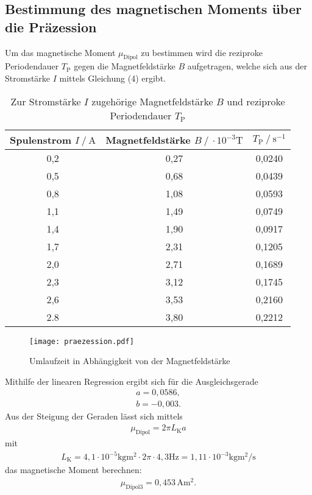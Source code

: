 \subsection{Bestimmung des magnetischen Moments über die Präzession}
Um das magnetische Moment $\mu_\text{Dipol}$ zu bestimmen wird die reziproke Periodendauer $T_\text{P}$
gegen die Magnetfeldstärke $B$ aufgetragen, welche sich aus der Stromstärke $I$ mittels Gleichung (4) ergibt.
\begin{table}
\centering
\caption{Zur Stromstärke $I$ zugehörige Magnetfeldstärke $B$ und reziproke Periodendauer $T_\text{P}$}
\label{tab:praezession}
\begin{tabular}{c c c}
\toprule
Spulenstrom $I\:/\:\si{\ampere}$ & Magnetfeldstärke $B\:/\:\cdot 10^{-3}\si{\tesla}$ & $T_\text{P}\:/\:\si{\second}^{-1}$ \\
\midrule
0,2 & 0,27 & 0,0240 \\
0,5 & 0,68 & 0,0439 \\
0,8 & 1,08 & 0,0593 \\
1,1 & 1,49 & 0,0749 \\
1,4 & 1,90 & 0,0917 \\
1,7 & 2,31 & 0,1205 \\
2,0 & 2,71 & 0,1689 \\
2,3 & 3,12 & 0,1745 \\
2,6 & 3,53 & 0,2160 \\
2.8 & 3,80 & 0,2212 \\
\bottomrule
\end{tabular}
\end{table}
\begin{figure}
  \center
  \texttt{[image: praezession.pdf]}
  \caption{Umlaufzeit in Abhängigkeit von der Magnetfeldstärke}
  \label{fig:praezession}
\end{figure}

Mithilfe der linearen Regression ergibt sich für die Ausgleichsgerade
\begin{gather*}
a = 0,0586, \\
b = -0,003.
\end{gather*}
Aus der Steigung der Geraden lässt sich mittels
\begin{gather}
\mu_\text{Dipol} = 2\pi L_\text{K} a
\end{gather}
mit
\begin{gather*}
L_\text{K} = 4,1 \cdot 10^{-5} \si{\kilo\gram\meter\squared} \cdot 2\pi \cdot 4,3\si{\hertz} = 1,11 \cdot 10^{-3} \si{\kilo\gram\meter\squared\per\second}
\end{gather*}
das magnetische Moment berechnen:
\begin{gather*}
\mu_\text{Dipol3} = 0,453\,\si{\ampere\meter\squared}.
\end{gather*}